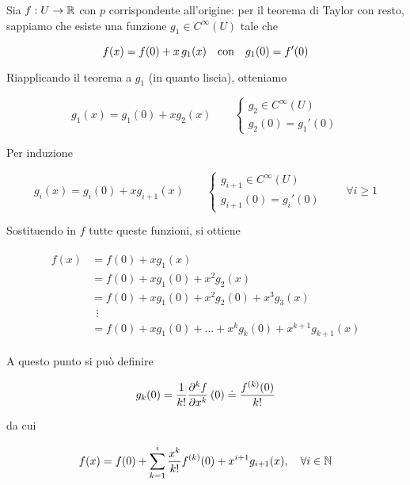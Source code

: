 Sia $ f : U \to \mathbb{R} $ con $ p $ corrispondente all'origine: per il teorema di Taylor con resto, sappiamo che esiste una funzione $ g_{1} \in C^{\infty}(U) $ tale che

\begin{equation}
	f(x) = f(0) + x \, g_{1}(x) \qq{con} g_{1}(0) = f'(0)
\end{equation}

Riapplicando il teorema a $ g_{1} $ (in quanto liscia), otteniamo

\begin{equation}
	g_{1}(x) = g_{1}(0) + x g_{2}(x) %
	\qquad %
	\begin{cases}
		g_{2} \in C^{\infty}(U) \\
		g_{2}(0) = g_{1}'(0)
	\end{cases}
\end{equation}

Per induzione

\begin{equation}
	g_{i}(x) = g_{i}(0) + x g_{i+1}(x) %
	\qquad %
	\begin{cases}
		g_{i+1} \in C^{\infty} (U) \\
		g_{i+1}(0) = g_{i}'(0)
	\end{cases} %
	\qquad %
	\forall i \geqslant 1
\end{equation}

Sostituendo in $ f $ tutte queste funzioni, si ottiene

\begin{align}
	\begin{split}
			f(x) &= f(0) + x g_{1}(x) \\
			&= f(0) + x g_{1}(0) + x^{2} g_{2}(x) \\
			&= f(0) + x g_{1}(0) + x^{2} g_{2}(0) + x^{3} g_{3}(x) \\
			& \;\, \vdots \\
			&= f(0) + x g_{1}(0) + \dots + x^{k} g_{k}(0) + x^{k+1} g_{k+1}(x)
	\end{split}
\end{align}

A questo punto si può definire

\begin{equation}
	g_{k}(0) = \dfrac{1}{k!} \pdv[k]{f}{x} \, (0) \doteq \dfrac{f^{(k)}(0)}{k!}
\end{equation}

da cui

\begin{equation}
	f(x) = f(0) + \sum_{k=1}^{i} \dfrac{x^{k}}{k!} f^{(k)} (0) + x^{i+1} g_{i+1}(x) \qcomma \forall i \in \N
\end{equation}

